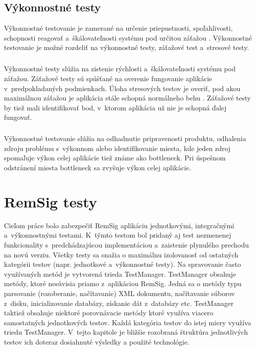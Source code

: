 \documentclass[
  digital, %
  table,   %
oneside,
  nolof,     %
  nolot,     %
]{fithesis3}
\begin{document}
\section{Výkonnostné testy}
Výkonnostné testovanie je zamerané na určenie priepustnosti, spoľahlivosti, schopnosti reagovať a~škálovateľnosti systému pod určitou záťažou \cite{ssl3.0}\cite{perfromanceTest}. Výkonnostné testovanie je možné rozdeliť na výkonnostné testy, záťažové test a~stresové testy.\paragraph{}
Výkonnostné testy slúžia na zistenie rýchlosti a~škálovateľnosti systému pod záťažou. Záťažové testy sú spúšťané na overenie fungovanie aplikácie v~predpokladaných podmienkach. Úloha stresových  testov je overiť, pod akou maximálnou záťažou je aplikácia stále schopná normálneho behu \cite{effectiveSoftwareTesting}. Záťažové testy by tiež mali identifikovať bod, v~ktorom aplikácia už nie je schopná ďalej fungovať.\paragraph{}
Výkonnostné testovanie slúžia na odhadnutie pripravenosti produktu, odhalenia zdroju problému s~výkonnom alebo  identifikovanie miesta, kde jeden zdroj spomaľuje výkon celej aplikácie tiež známe ako bottleneck. Pri úspešnom odstránení miesta bottleneck sa zvyšuje výkon celej aplikácie.
\chapter{RemSig testy}
Cieľom práce bolo zabezpečiť  RemSig aplikáciu jednotkovými, integračnými a~výkonnostnými testami. K~týmto testom bol pridaný aj test nezmenenej funkcionality s~predchádzajúcou implementáciou a~zaistenie plynulého prechodu na novú verziu. Všetky  testy sa snažia o maximálnu izolovanosť od ostatných kategórii  testov (napr. jednotkové a~výkonnostné testy). Na spravovanie často využívaných metód je vytvorená trieda TestManager. TestManager obsahuje metódy, ktoré nesúvisia priamo z~aplikáciou RemSig. Jedná sa o metódy typu parsovanie (rozoberanie, načítavanie) XML dokumentu, načítavanie súborov z~disku, inicializovanie databázy, získanie dát z~databázy etc. TestManager taktiež obsahuje niektoré porovnávacie metódy ktoré využíva viacero samostatných jednotkových testov. Každá kategória testov do istej miery využíva triedu TestManager. V~tejto kapitole je bližšie rozobraná štruktúra jednotlivých testov ich doteraz dosiahnuté výsledky a použité technológie.
\end{document}
